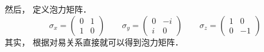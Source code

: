 \begin{enumerate}
然后， 定义泡力矩阵．  
\begin{equation}
{\sigma_x} = \left( {\begin{array}{*{20}{c}}
0&1\\
1&0
\end{array}} \right)
\qquad
{\sigma_y} = \left( {\begin{array}{*{20}{c}}
0&{ - i}\\
i&0
\end{array}} \right)
\qquad
{\sigma_z} = \left( {\begin{array}{*{20}{c}}
1&0\\
0&{ - 1}
\end{array}} \right)
\end{equation}
其实， 根据对易关系直接就可以得到泡力矩阵．
\end{enumerate}

